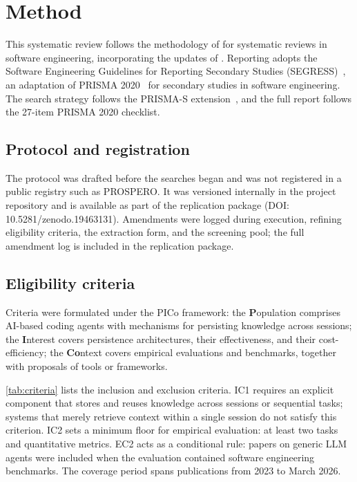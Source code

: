 \section{Method}
\label{sec:method}

This systematic review follows the methodology of
\citet{kitchenham2007guidelines} for systematic reviews in software
engineering, incorporating the updates of
\citet{kitchenham2013systematic}.
Reporting adopts the Software Engineering Guidelines for Reporting
Secondary Studies (SEGRESS)~\citep{kitchenham2023segress}, an adaptation
of PRISMA 2020~\citep{page2021prisma} for secondary studies in software
engineering.
The search strategy follows the PRISMA-S
extension~\citep{rethlefsen2021prismas}, and the full report follows the
27-item PRISMA 2020 checklist.

\subsection{Protocol and registration}
\label{sec:protocol}

The protocol was drafted before the searches began and was not
registered in a public registry such as PROSPERO.
It was versioned internally in the project repository and is
available as part of the replication package (DOI: 10.5281/zenodo.19463131).
Amendments were logged during execution, refining eligibility
criteria, the extraction form, and the screening pool;
the full amendment log is included in the replication package.

\subsection{Eligibility criteria}
\label{sec:criteria}

Criteria were formulated under the PICo framework:
the \textbf{P}opulation comprises AI-based coding agents with mechanisms
for persisting knowledge across sessions;
the \textbf{I}nterest covers persistence architectures, their
effectiveness, and their cost-efficiency;
the \textbf{Co}ntext covers empirical evaluations and benchmarks,
together with proposals of tools or frameworks.

\autoref{tab:criteria} lists the inclusion and exclusion criteria.
IC1 requires an explicit component that stores and reuses knowledge
across sessions or sequential tasks;
systems that merely retrieve context within a single session do not
satisfy this criterion.
IC2 sets a minimum floor for empirical evaluation: at least two tasks
and quantitative metrics.
EC2 acts as a conditional rule: papers on generic LLM agents were
included when the evaluation contained software engineering benchmarks.
The coverage period spans publications from 2023 to March 2026.

